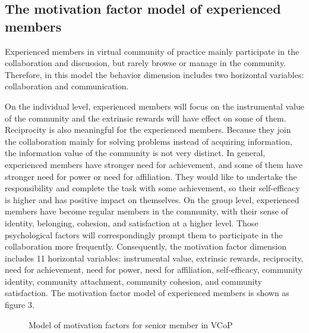 \documentclass{elsarticle}
\begin{document}
\subsection{The motivation factor model of experienced members}
\label{sec:motiv-fact-model}

 Experienced members in virtual community of practice mainly
 participate in the collaboration and discussion, but rarely browse or
 manage in the community. Therefore, in this model the behavior
 dimension includes two horizontal variables: collaboration and
 communication. 

   On the individual level, experienced members will focus on the
   instrumental value of the community and the extrinsic rewards will
   have effect on some of them. Reciprocity is also meaningful for the
   experienced members. Because they join the collaboration mainly for
   solving problems instead of acquiring information, the information
   value of the community is not very distinct. In general,
   experienced members have stronger need for achievement, and some of
   them have stronger need for power or need for affiliation. They
   would like to undertake the responsibility and complete the task
   with some achievement, so their self-efficacy is higher and has
   positive impact on themselves. On the group level, experienced
   members have become regular members in the community, with their
   sense of identity, belonging, cohesion, and satisfaction at a
   higher level. Those psychological factors will correspondingly
   prompt them to participate in the collaboration more
   frequently. Consequently, the motivation factor dimension includes
   11 horizontal variables: instrumental value, extrinsic rewards,
   reciprocity, need for achievement, need for power, need for
   affiliation, self-efficacy, community identity, community
   attachment, community cohesion, and community satisfaction. The
   motivation factor model of experienced members is shown as figure
   3.
\begin{figure}[htpb]
  \centering
  \label{fig:senior member}
  \caption{Model of motivation factors for senior
    member in VCoP}
\end{figure}
\end{document}
